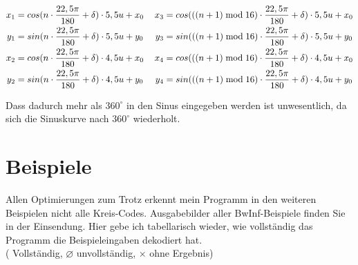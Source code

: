 \begin{gather}
	\begin{split}
		x_1 &= cos(n \cdot \frac{22,5\pi}{180} + \delta) \cdot 5,5u + x_0\\
		y_1 &= sin(n \cdot \frac{22,5\pi}{180} + \delta) \cdot 5,5u + y_0\\ \vspace{2em}
		x_2 &= cos(n \cdot \frac{22,5\pi}{180} + \delta) \cdot 4,5u + x_0\\
		y_2 &= sin(n \cdot \frac{22,5\pi}{180} + \delta) \cdot 4,5u + y_0
	\end{split}
	\hspace{1.2em}
	\begin{split}
		x_3 &= cos(((n+1)\bmod{}16) \cdot \frac{22,5\pi}{180} + \delta) \cdot 5,5u + x_0\\
		y_3 &= sin(((n+1)\bmod{}16) \cdot \frac{22,5\pi}{180} + \delta) \cdot 5,5u + y_0 \\ \vspace{2em}
		x_4 &= cos(((n+1)\bmod{}16) \cdot \frac{22,5\pi}{180} + \delta) \cdot 4,5u + x_0\\
		y_4 &= sin(((n+1)\bmod{}16) \cdot \frac{22,5\pi}{180} + \delta) \cdot 4,5u + y_0
	\end{split} \label{eq:nKoordsNeu}
\end{gather}

Dass dadurch mehr als \(360^{\circ}\) in den Sinus eingegeben werden ist unwesentlich, da sich die Sinuskurve nach \(360^{\circ}\) wiederholt.
\pagebreak
\section{Beispiele}
Allen Optimierungen zum Trotz erkennt mein Programm in den weiteren Beispielen nicht alle Kreis-Codes. Ausgabebilder aller BwInf-Beispiele finden Sie in der Einsendung. Hier gebe ich tabellarisch wieder, wie vollständig das Programm die Beispieleingaben dekodiert hat. \\ 
(\checkmark{} Vollständig, \(\varnothing\) unvollständig, \(\times\) ohne Ergebnis)

